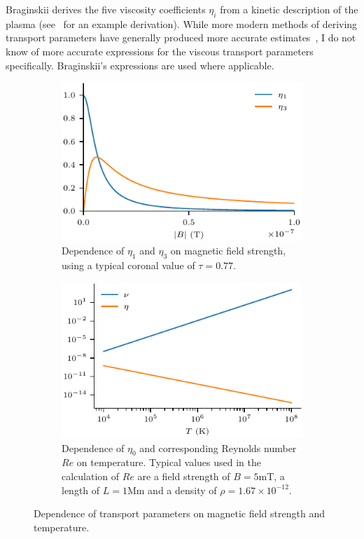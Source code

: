Braginskii derives the five viscosity coefficients $\eta_i$ from a kinetic description of the plasma (see~\cite{epperleinPlasmaTransportCoefficients1986} for an example derivation). While more modern methods of deriving transport parameters have generally produced more accurate estimates~\cite{epperleinPlasmaTransportCoefficients1986}, I do not know of more accurate expressions for the viscous transport parameters specifically. Braginskii's expressions are used where applicable.

\begin{figure}[t]
  \centering
    \begin{subfigure}{0.49\textwidth}
      \includegraphics[width=\linewidth]{brag_coeffs.pdf}
      \caption{Dependence of $\eta_1$ and $\eta_3$ on magnetic field strength, using a typical coronal value of $\tau = 0.77$.}
      \label{fig:brag_coeffs}
    \end{subfigure}
    \hfill
    \begin{subfigure}{0.49\textwidth}
      \includegraphics[width=\linewidth]{visc_dep_on_temp.pdf}
      \caption{Dependence of $\eta_0$ and corresponding Reynolds number $Re$ on temperature. Typical values used in the calculation of $Re$ are a field strength of $B = 5$mT, a length of $L = 1$Mm and a density of $\rho = 1.67 \times 10^{-12}$.}
      \label{fig:visc_dep_on_temp}
    \end{subfigure}
\caption{Dependence of transport parameters on magnetic field strength and temperature.}
\label{fig:visc_dep}%
\end{figure}


